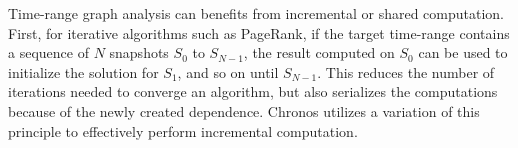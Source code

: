 \documentclass[graybox, natbib, nosecnum, twocolumn]{svmult}
\begin{document}



\vspace{2mm}

 Time-range graph analysis can benefits from incremental or shared computation. First, for iterative algorithms such as PageRank, if the target time-range contains a sequence of $N$ snapshots $S_0$ to $S_{N-1}$, the result computed on $S_0$ can be used to initialize the solution for $S_1$, and so on until $S_{N-1}$. This reduces the number of iterations needed to converge an algorithm, but also serializes the computations because of the newly created dependence. Chronos utilizes a variation of this principle to effectively perform incremental computation. 
\end{document}
